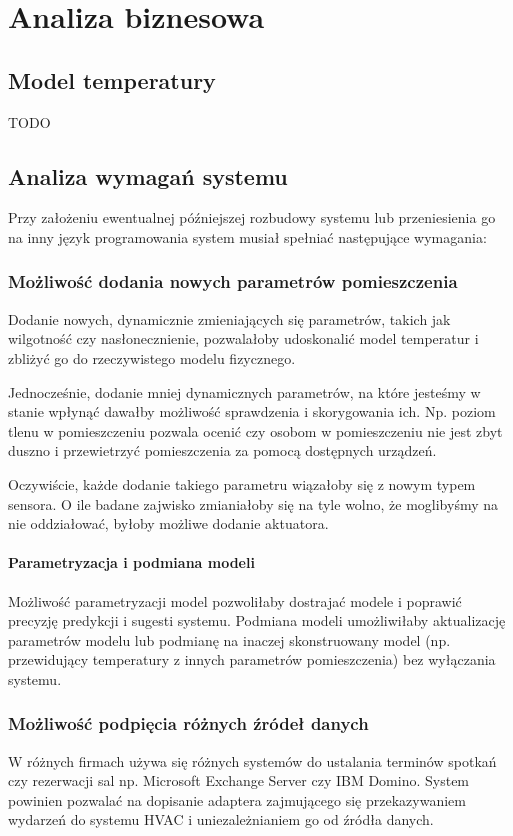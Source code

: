 \chapter{Analiza biznesowa}

\section{Model temperatury}
TODO

\section{Analiza wymagań systemu}
Przy założeniu ewentualnej późniejszej rozbudowy systemu lub przeniesienia go na inny język programowania system musiał spełniać następujące wymagania:

\subsection*{Możliwość dodania nowych parametrów pomieszczenia}
Dodanie nowych, dynamicznie zmieniających się parametrów, takich jak wilgotność czy nasłonecznienie, pozwalałoby udoskonalić model temperatur i zbliżyć go do rzeczywistego modelu fizycznego.

Jednocześnie, dodanie mniej dynamicznych parametrów, na które jesteśmy w stanie wpłynąć dawałby możliwość sprawdzenia i skorygowania ich. Np. poziom tlenu w pomieszczeniu pozwala ocenić czy osobom w pomieszczeniu nie jest zbyt duszno i przewietrzyć pomieszczenia za pomocą dostępnych urządzeń.

Oczywiście, każde dodanie takiego parametru wiązałoby się z nowym typem sensora. O ile badane zajwisko zmianiałoby się na tyle wolno, że moglibyśmy na nie oddziałować, byłoby możliwe dodanie aktuatora.

\subsubsection*{Parametryzacja i podmiana modeli}
Możliwość parametryzacji model pozwoliłaby dostrajać modele i poprawić precyzję predykcji i sugesti systemu.
Podmiana modeli umożliwiłaby aktualizację parametrów modelu lub podmianę na inaczej skonstruowany model (np. przewidujący temperatury z innych parametrów pomieszczenia) bez wyłączania systemu. 

\subsection*{Możliwość podpięcia różnych źródeł danych}
W różnych firmach używa się różnych systemów do ustalania terminów spotkań czy rezerwacji sal np. Microsoft Exchange Server czy IBM Domino.
System powinien pozwalać na dopisanie adaptera zajmującego się przekazywaniem wydarzeń do systemu HVAC i uniezależnianiem go od źródła danych.

